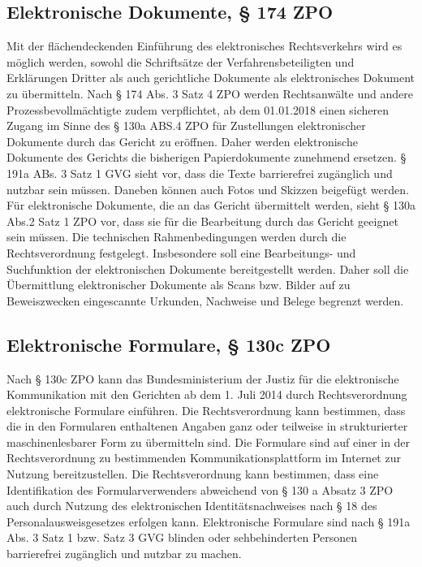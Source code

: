 \subsection*{Elektronische Dokumente, § 174 ZPO}
Mit der flächendeckenden Einführung des elektronisches Rechtsverkehrs wird es möglich werden, sowohl die Schriftsätze der Verfahrensbeteiligten und Erklärungen Dritter als auch gerichtliche Dokumente als elektronisches Dokument zu übermitteln. Nach § 174 Abs. 3 Satz 4 ZPO werden Rechtsanwälte und andere Prozessbevollmächtigte zudem verpflichtet, ab dem 01.01.2018 einen sicheren Zugang im Sinne des § 130a ABS.4 ZPO für Zustellungen elektronischer Dokumente durch das Gericht zu eröffnen. Daher werden elektronische Dokumente des Gerichts die bisherigen Papierdokumente zunehmend ersetzen. § 191a ABs. 3 Satz 1 GVG sieht vor, dass die Texte barrierefrei zugänglich und nutzbar sein müssen. Daneben können auch Fotos und Skizzen beigefügt werden. Für elektronische Dokumente, die an das Gericht übermittelt werden, sieht § 130a Abs.2 Satz 1 ZPO vor, dass sie für die Bearbeitung durch das Gericht geeignet sein müssen. Die technischen Rahmenbedingungen werden durch die Rechtsverordnung festgelegt. Insbesondere soll eine Bearbeitungs- und Suchfunktion der elektronischen Dokumente bereitgestellt werden. Daher soll die Übermittlung elektronischer Dokumente als Scans bzw. Bilder auf zu Beweiszwecken eingescannte Urkunden, Nachweise und Belege begrenzt werden. 
\subsection*{Elektronische Formulare, § 130c ZPO}
Nach § 130c ZPO kann das Bundesministerium der Justiz für die elektronische Kommunikation mit den Gerichten ab dem 1. Juli 2014 durch Rechtsverordnung elektronische Formulare einführen. Die Rechtsverordnung kann bestimmen, dass die in den Formularen enthaltenen Angaben ganz oder teilweise in strukturierter maschinenlesbarer Form zu übermitteln sind. Die Formulare sind auf einer in der Rechtsverordnung zu bestimmenden Kommunikationsplattform im Internet zur Nutzung bereitzustellen.  Die Rechtsverordnung kann bestimmen, dass eine Identifikation des Formularverwenders abweichend von § 130 a Absatz 3 ZPO auch durch Nutzung des elektronischen Identitätsnachweises nach § 18 des Personalausweisgesetzes erfolgen kann. Elektronische Formulare sind nach § 191a Abs. 3 Satz 1 bzw. Satz 3 GVG blinden oder sehbehinderten Personen barrierefrei zugänglich und nutzbar zu machen.
